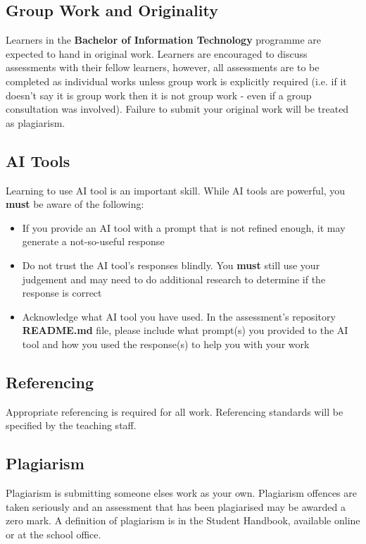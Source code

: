 \documentclass{article}
\begin{document}
\subsection*{Group Work and Originality}
Learners in the \textbf{Bachelor of Information Technology} programme are expected to hand in original work. Learners are encouraged to discuss assessments with their fellow learners, however, all assessments are to be completed as individual works unless group work is explicitly required (i.e. if it doesn't say it is group work then it is not group work - even if a group consultation was involved). Failure to submit your original work will be treated as plagiarism.

\subsection*{AI Tools}
Learning to use AI tool is an important skill. While AI tools are powerful, you \textbf{must} be aware of the following:

\begin{itemize}
    \item If you provide an AI tool with a prompt that is not refined enough, it may generate a not-so-useful response
    \item Do not trust the AI tool's responses blindly. You \textbf{must} still use your judgement and may need to do additional research to determine if the response is correct
    \item Acknowledge what AI tool you have used. In the assessment's repository \textbf{README.md} file, please include what prompt(s) you provided to the AI tool and how you used the response(s) to help you with your work
\end{itemize}

\subsection*{Referencing}
Appropriate referencing is required for all work. Referencing standards will be specified by the teaching staff.

\subsection*{Plagiarism}
Plagiarism is submitting someone elses work as your own. Plagiarism offences are taken seriously and an assessment that has been plagiarised may be awarded a zero mark. A definition of plagiarism is in the Student Handbook, available online or at the school office.
\end{document}
